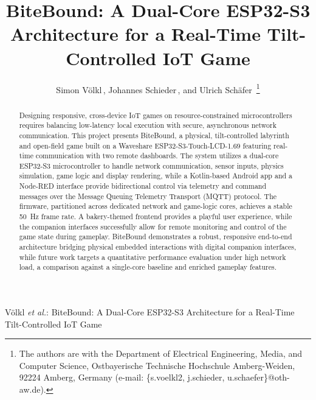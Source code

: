 \documentclass[10pt,journal,final,a4paper]{IEEEtran}
\begin{document}
\title{BiteBound: A Dual-Core ESP32-S3 Architecture for a Real-Time Tilt-Controlled IoT Game} 

\author{Simon Völkl\,, 
        Johannes Schieder\,, 
        and Ulrich Schäfer\,%
\thanks{The authors are with the Department of Electrical Engineering, Media, and Computer Science, Ostbayerische Technische Hochschule Amberg-Weiden, 92224 Amberg, Germany (e-mail: \{s.voelkl2, j.schieder, u.schaefer\}@oth-aw.de).}%
}

{Völkl \MakeLowercase{\textit{et al.}}: BiteBound: A Dual-Core ESP32-S3 Architecture for a Real-Time Tilt-Controlled IoT Game}

\maketitle

\begin{abstract}
    Designing responsive, cross-device IoT games on resource-constrained microcontrollers requires balancing low-latency local execution with secure, asynchronous network communication.
    This project presents BiteBound, a physical, tilt-controlled labyrinth and open-field game built on a Waveshare ESP32-S3-Touch-LCD-1.69 featuring real-time communication with two remote dashboards.
    The system utilizes a dual-core ESP32-S3 microcontroller to handle network communication, sensor inputs, physics simulation, game logic and display rendering, while a Kotlin-based Android app and a Node-RED interface provide bidirectional control via telemetry and command messages over the Message Queuing Telemetry Transport (MQTT) protocol.
    The firmware, partitioned across dedicated network and game-logic cores, achieves a stable \SI{50}{\hertz} frame rate. A bakery-themed frontend provides a playful user experience, while the companion interfaces successfully allow for remote monitoring and control of the game state during gameplay.
    BiteBound demonstrates a robust, responsive end-to-end architecture bridging physical embedded interactions with digital companion interfaces, while future work targets a quantitative performance evaluation under high network load, a comparison against a single-core baseline and enriched gameplay features.
\end{abstract}
\end{document}
